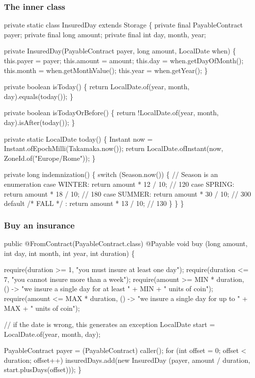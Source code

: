 \documentclass[11pt]{beamer}  %
\begin{document}
\begin{frame}[fragile]\frametitle{The inner class}

\vspace{-1ex}
{\tiny\begin{semiverbatim}
private static class InsuredDay extends {\color{blue}Storage} \{
  private final PayableContract payer;
  private final long amount;
  private final int day, month, year;

  private InsuredDay(PayableContract payer, long amount, LocalDate when) \{
    this.payer = payer;
    this.amount = amount;
    this.day = when.getDayOfMonth();  this.month = when.getMonthValue();  this.year = when.getYear();
  \}

  private boolean isToday() \{
    return LocalDate.of(year, month, day).equals(today());
  \}

  private boolean isTodayOrBefore() \{
    return !LocalDate.of(year, month, day).isAfter(today());
  \}

  private static LocalDate today() \{
    Instant now = Instant.ofEpochMilli(Takamaka.now());
    return LocalDate.ofInstant(now, ZoneId.of("Europe/Rome"));
  \}

  private long indemnization() \{
    switch (Season.now()) \{  // Season is an enumeration
      case WINTER: return amount * 12 / 10; // 120%
      case SPRING: return amount * 18 / 10; // 180%
      case SUMMER: return amount * 30 / 10; // 300%
      default /* FALL */ : return amount * 13 / 10; // 130%
    \}
  \}
\}
\end{semiverbatim}}

\end{frame}

\begin{frame}[fragile]\frametitle{Buy an insurance}

{\scriptsize\begin{semiverbatim}
public {\color{violet}@FromContract(PayableContract.class)} {\color{airforceblue}@Payable} void buy
    ({\color{airforceblue}long amount}, int day, int month, int year, int duration) \{

  {\color{armygreen}require(duration >= 1, "you must insure at least one day");
  require(duration <= 7, "you cannot insure more than a week");
  require(amount >= MIN * duration,
    () -> "we insure a single day for at least " + MIN + " units of coin");
  require(amount <= MAX * duration,
    () -> "we insure a single day for up to " + MAX + " units of coin");}

  // if the date is wrong, this generates an exception
  LocalDate start = LocalDate.of(year, month, day);

  PayableContract payer = (PayableContract) {\color{violet}caller()};
  for (int offset = 0; offset < duration; offset++)
    insuredDays.add(new InsuredDay
                    (payer, amount / duration, start.plusDays(offset)));
\}
\end{semiverbatim}}

\end{frame}
\end{document}
